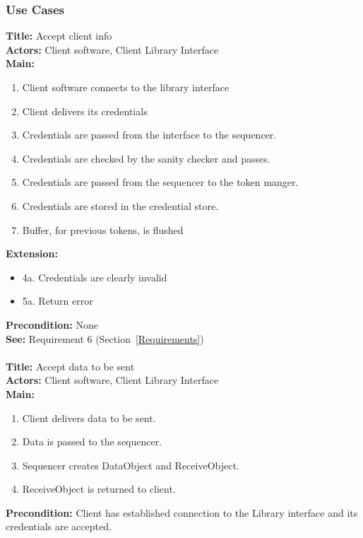 	\subsubsection{Use Cases}\label{client use cases}
		\textbf{Title:} Accept client info \\
		\textbf{Actors:} Client software, Client Library Interface \\
		\textbf{Main:}
		\begin{enumerate}
			\item Client software connects to the library interface
			\item Client delivers its credentials
			\item Credentials are passed from the interface to the sequencer.
			\item Credentials are checked by the sanity checker and passes.
			\item Credentials are passed from the sequencer to the token manger.
			\item Credentials are stored in the credential store.
			\item Buffer, for previous tokens, is flushed
		\end{enumerate}
		\textbf{Extension:} 
		\begin{itemize}
			  \item[] 4a. Credentials are clearly invalid
			  \item[] 5a. Return error
		\end{itemize}
		\textbf{Precondition:}  None\\
		\textbf{See:} Requirement 6 (Section~\ref{Requirements})
		\\\\
		\textbf{Title:} Accept data to be sent \\
		\textbf{Actors:} Client software, Client Library Interface \\
		\textbf{Main:}
		\begin{enumerate}
			\item Client delivers data to be sent.
			\item Data is passed to the sequencer.
			\item Sequencer creates DataObject and ReceiveObject.
			\item ReceiveObject is returned to client.
		\end{enumerate}
		\textbf{Precondition:} Client has established connection to the Library interface and its credentials are accepted. \\
